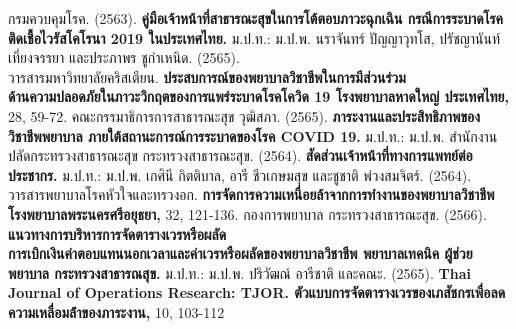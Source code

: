 %
%
%
%
%
%
%
%
%

\begin{thebibliography}{99}

    กรมควบคุมโรค. (2563). \textbf{คู่มือเจ้าหน้าที่สาธารณะสุขในการโต้ตอบภาวะฉุกเฉิน กรณีการระบาดโรคติดเชื้อไวรัสโคโรนา 2019 ในประเทศไทย.} ม.ป.ท.: ม.ป.พ.
    นราจันทร์ ปัญญาวุทโส, ปรัชญานันท์ เที่ยงจรรยา และประภาพร ชูกำเหนิด. (2565). \\วารสารมหาวิทยาลัยคริสเตียน. \textbf{ประสบการณ์ของพยาบาลวิชาชีพในการมีส่วนร่วม\\ด้านความปลอดภัยในภาวะวิกฤตของการแพร่ระบาดโรคโควิด 19 โรงพยาบาลหาดใหญ่ ประเทศไทย,} 28, 59-72.
    คณะกรรมาธิการการสาธารณะสุข วุฒิสภา. (2565). \textbf{ภาระงานและประสิทธิภาพของวิชาชีพพยาบาล ภายใต้สถานะการณ์การระบาดของโรค COVID 19.} ม.ป.ท.: ม.ป.พ.
    สำนักงานปลัดกระทรวงสาธารณะสุข กระทรวงสาธารณะสุข. (2564). \textbf{สัดส่วนเจ้าหน้าที่ทางการแพทย์ต่อประชากร.} ม.ป.ท.: ม.ป.พ.
    เกศินี กิตติบาล, อารี ชีวเกษมสุข และชูชาติ พ่วงสมจิตร์. (2564). วารสารพยาบาลโรคหัวใจและทรวงอก. \textbf{การจัดการความเหนื่อยล้าจากการทํางานของพยาบาลวิชาชีพ \\โรงพยาบาลพระนครศรีอยุธยา,} 32, 121-136.
    กองการพยาบาล กระทรวงสาธารณะสุข. (2566). \textbf{แนวทางการบริหารการจัดตารางเวรหรือผลัด \\การเบิกเงินค่าตอบแทนนอกเวลาและค่าเวรหรือผลัดของพยาบาลวิชาชีพ พยาบาลเทคนิค ผู้ช่วยพยาบาล กระทรวงสาธารณสุข.} ม.ป.ท.: ม.ป.พ.
    ปริวัฒณ์ อารีชาติ และคณะ. (2565). \textbf{Thai Journal of Operations Research: TJOR. ตัวแบบการจัดตารางเวรของเภสัชกรเพื่อลดความเหลื่อมล้ําของภาระงาน,} 10, 103-112
\end{thebibliography}